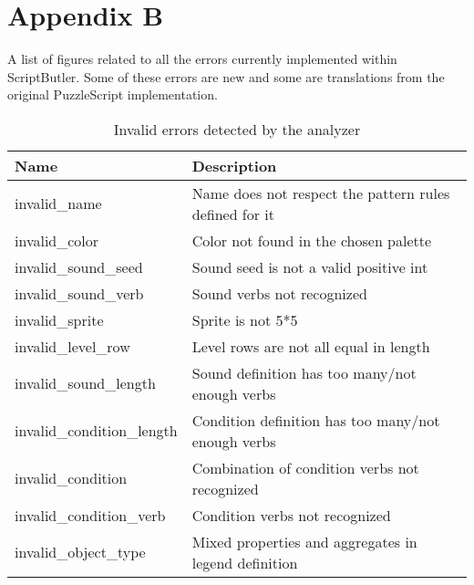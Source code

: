 \pagebreak
\section{Appendix B}
A list of figures related to all the errors currently implemented within ScriptButler. Some of these errors are new and some are translations from the original PuzzleScript implementation.

\begin{table}[!htbp]
\centering
\caption{Invalid errors detected by the analyzer}
\label{tab:static_errors_invalid}
\scriptsize
\begin{tabular}{ll}
\textbf{Name} & \textbf{Description}                                                                    \\ \hline
invalid\_name                                       & Name does not respect the pattern rules defined for it                        \\
invalid\_color                                      & Color not found in the chosen palette                                          \\
invalid\_sound\_seed                                & Sound seed is not a valid positive int                                         \\
invalid\_sound\_verb                                & Sound verbs not recognized                                                     \\
invalid\_sprite                                     & Sprite is not 5*5                                                              \\
invalid\_level\_row                                 & Level rows are not all equal in length                                         \\
invalid\_sound\_length                              & Sound definition has too many/not enough verbs                                 \\
invalid\_condition\_length                          & Condition definition has too many/not enough verbs                             \\
invalid\_condition                                  & Combination of condition verbs not recognized                                  \\
invalid\_condition\_verb                            & Condition verbs not recognized                                                 \\
invalid\_object\_type                               & Mixed properties and aggregates in legend definition                           \\

\end{tabular}
\end{table}
